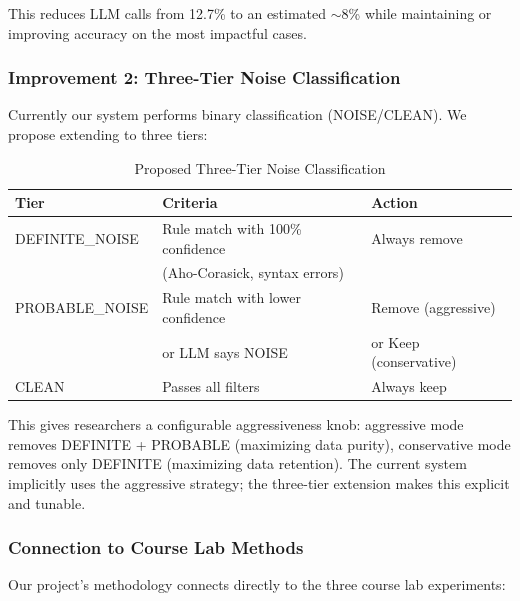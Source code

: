 \documentclass[acmlarge,nonacm,screen]{acmart}
\begin{document}
This reduces LLM calls from 12.7\% to an estimated $\sim$8\% while maintaining or improving accuracy on the most impactful cases.

\subsubsection{Improvement 2: Three-Tier Noise Classification}

Currently our system performs binary classification (NOISE/CLEAN). We propose extending to three tiers:

\begin{table}[htbp]
\caption{Proposed Three-Tier Noise Classification}
\label{tab:three-tier}
\begin{tabular}{@{}lll@{}}
\toprule
\textbf{Tier} & \textbf{Criteria} & \textbf{Action} \\
\midrule
DEFINITE\_NOISE & Rule match with 100\% confidence & Always remove \\
 & (Aho-Corasick, syntax errors) & \\
PROBABLE\_NOISE & Rule match with lower confidence & Remove (aggressive) \\
 & or LLM says NOISE & or Keep (conservative) \\
CLEAN & Passes all filters & Always keep \\
\bottomrule
\end{tabular}
\end{table}

This gives researchers a configurable aggressiveness knob: aggressive mode removes DEFINITE + PROBABLE (maximizing data purity), conservative mode removes only DEFINITE (maximizing data retention). The current system implicitly uses the aggressive strategy; the three-tier extension makes this explicit and tunable.

\subsubsection{Connection to Course Lab Methods}

Our project's methodology connects directly to the three course lab experiments:
\end{document}
